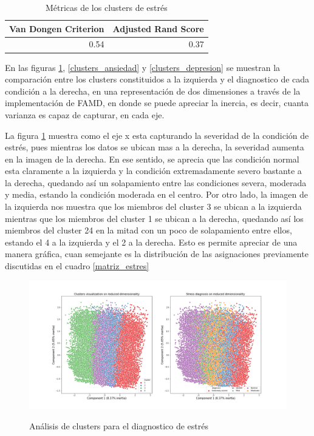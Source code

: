 \begin{table}[ht]
\centering
\caption{Métricas de los clusters de estrés}
\begin{tabular}{rr}
\toprule
 Van Dongen Criterion &  Adjusted Rand Score \\
\midrule
0.54 & 0.37 \\
\bottomrule
\end{tabular}
\label{metricas_matriz_estres}
\end{table}%


 
 En las figuras \ref{clusters_estres}, \ref{clusters_ansiedad} y \ref{clusters_depresion} se muestran la comparación entre los clusters constituidos a la izquierda y el diagnostico de cada condición a la derecha, en una representación de dos dimensiones a través de la implementación de FAMD, en donde se puede apreciar la inercia, es decir, cuanta varianza es capaz de capturar, en cada eje. 

\medbreak

 
La figura \ref{clusters_estres} muestra como el eje x esta capturando la severidad de la condición de estrés, pues mientras los datos se ubican mas a la derecha, la severidad aumenta en la imagen de la derecha. En ese sentido, se aprecia que las condición normal esta claramente a la izquierda y la condición extremadamente severo bastante a la derecha, quedando así  un solapamiento entre las condiciones severa, moderada y media, estando la condición moderada en el centro. Por otro lado, la imagen de la izquierda nos muestra que los miembros del cluster 3 se ubican a la izquierda mientras que los miembros del cluster 1 se ubican a la derecha, quedando así los miembros del cluster 24 en la mitad con un poco de solapamiento entre ellos, estando el 4 a la izquierda y el 2 a la derecha. Esto es permite apreciar de una manera gráfica, cuan semejante es la distribución de las asignaciones previamente discutidas en el cuadro \ref{matriz_estres}


\begin{figure}[h]
\caption{Análisis de clusters para el diagnostico de estrés}
\centering
\includegraphics[width=\textwidth,height=\textheight,keepaspectratio]{Media/Pictures/stress_clusters.png} 
\label{clusters_estres}
\end{figure}

